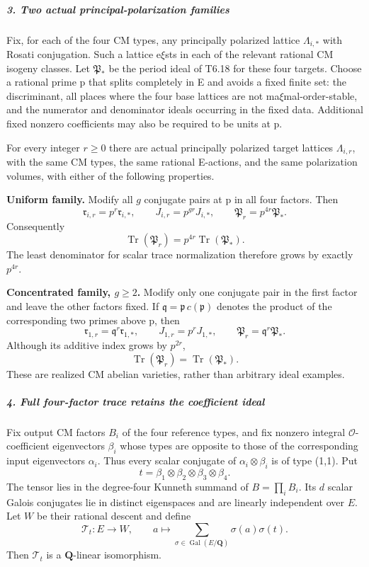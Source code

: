 \documentclass[11pt,a4paper]{article}
\theoremstyle{definition}
\begin{document}
\subparagraph{3. Two actual principal-polarization families}\label{two-actual-principal-polarization-families}

Fix, for each of the four CM types, any principally polarized lattice \(\Lambda_{i,*}\) with Rosati conjugation. Such a lattice e\(\xi\)sts in each of the relevant rational CM isogeny classes. Let \(\mathfrak P_*\) be the period ideal of T6.18 for these four targets. Choose a rational prime p that splits completely in E and avoids a fixed finite set: the discriminant, all places where the four base lattices are not ma\(\xi\)mal-order-stable, and the numerator and denominator ideals occurring in the fixed data. Additional fixed nonzero coefficients may also be required to be units at p.

For every integer \(r\ge0\) there are actual principally polarized target lattices \(\Lambda_{i,r}\), with the same CM types, the same rational E-actions, and the same polarization volumes, with either of the following properties.

\textbf{Uniform family.} Modify all \(g\) conjugate pairs at p in all four factors. Then \[
 \mathfrak r_{i,r}=p^r\mathfrak r_{i,*},\qquad
 J_{i,r}=p^{gr}J_{i,*},\qquad
 \mathfrak P_r=p^{4r}\mathfrak P_*.
 \tag{T19.3}
\] Consequently \[
 \operatorname{Tr}(\mathfrak P_r)
   =p^{4r}\operatorname{Tr}(\mathfrak P_*).
 \tag{T19.4}
\] The least denominator for scalar trace normalization therefore grows by exactly \(p^{4r}\).

\textbf{Concentrated family, \(g\ge2\).} Modify only one conjugate pair in the first factor and leave the other factors fixed. If \(\mathfrak q=\mathfrak p\,c(\mathfrak p)\) denotes the product of the corresponding two primes above p, then \[
 \mathfrak r_{1,r}=\mathfrak q^r\mathfrak r_{1,*},\qquad
 J_{1,r}=p^rJ_{1,*},\qquad
 \mathfrak P_r=\mathfrak q^r\mathfrak P_*.
 \tag{T19.5}
\] Although its additive index grows by \(p^{2r}\), \[
 \operatorname{Tr}(\mathfrak P_r)
    =\operatorname{Tr}(\mathfrak P_*).
 \tag{T19.6}
\] These are realized CM abelian varieties, rather than arbitrary ideal examples.

\subparagraph{4. Full four-factor trace retains the coefficient ideal}\label{full-four-factor-trace-retains-the-coefficient-ideal}

Fix output CM factors \(B_i\) of the four reference types, and fix nonzero integral \(\mathcal O\)-coefficient eigenvectors \(\beta_i\) whose types are opposite to those of the corresponding input eigenvectors \(\alpha_i\). Thus every scalar conjugate of \(\alpha_i\otimes\beta_i\) is of type (1,1). Put \[
 t=\beta_1\otimes\beta_2\otimes\beta_3\otimes\beta_4.
\] The tensor lies in the degree-four Kunneth summand of \(B=\prod_iB_i\). Its \(d\) scalar Galois conjugates lie in distinct eigenspaces and are linearly independent over \(E\). Let \(W\) be their rational descent and define \[
 \mathcal T_t:E\longrightarrow W,\qquad
 a\longmapsto\sum_{\sigma\in\operatorname{Gal}(E/\mathbf Q)}
                      \sigma(a)\sigma(t).
 \tag{T19.7}
\] Then \(\mathcal T_t\) is a \(\mathbf Q\)-linear isomorphism.
\end{document}
